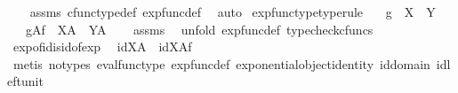 \begin{isabellebody}
%
\isadelimproof
\ \ %
\endisadelimproof
%
\isatagproof
{}\isamarkupfalse%
\ assms\ cfunc{\isacharunderscore}{\kern0pt}type{\isacharunderscore}{\kern0pt}def\ exp{\isacharunderscore}{\kern0pt}func{\isacharunderscore}{\kern0pt}def\ \isamarkupfalse%
\ auto%
\endisatagproof
{\isafoldproof}%
%
\isadelimproof
\isanewline
%
\endisadelimproof
\isanewline
{}\isamarkupfalse%
\ exp{\isacharunderscore}{\kern0pt}func{\isacharunderscore}{\kern0pt}type{\isacharbrackleft}{\kern0pt}type{\isacharunderscore}{\kern0pt}rule{\isacharbrackright}{\kern0pt}{\isacharcolon}{\kern0pt}\isanewline
\ \ \ {\isachardoublequoteopen}g\ {\isacharcolon}{\kern0pt}\ X\ {\isasymrightarrow}\ Y{\isachardoublequoteclose}\isanewline
\ \ \ {\isachardoublequoteopen}g\isactrlbsup A\isactrlesup \isactrlsub f\ {\isacharcolon}{\kern0pt}\ X\isactrlbsup A\isactrlesup \ {\isasymrightarrow}\ Y\isactrlbsup A\isactrlesup {\isachardoublequoteclose}\isanewline
%
\isadelimproof
\ \ %
\endisadelimproof
%
\isatagproof
{}\isamarkupfalse%
\ assms\ \isamarkupfalse%
\ {\isacharparenleft}{\kern0pt}unfold\ exp{\isacharunderscore}{\kern0pt}func{\isacharunderscore}{\kern0pt}def{}{\isacharcomma}{\kern0pt}\ typecheck{\isacharunderscore}{\kern0pt}cfuncs{\isacharparenright}{\kern0pt}%
\endisatagproof
{\isafoldproof}%
%
\isadelimproof
\isanewline
%
\endisadelimproof
\isanewline
{}\isamarkupfalse%
\ exp{\isacharunderscore}{\kern0pt}of{\isacharunderscore}{\kern0pt}id{\isacharunderscore}{\kern0pt}is{\isacharunderscore}{\kern0pt}id{\isacharunderscore}{\kern0pt}of{\isacharunderscore}{\kern0pt}exp{\isacharcolon}{\kern0pt}\isanewline
\ \ {\isachardoublequoteopen}id{\isacharparenleft}{\kern0pt}X\isactrlbsup A\isactrlesup {\isacharparenright}{\kern0pt}\ {\isacharequal}{\kern0pt}\ {\isacharparenleft}{\kern0pt}id{\isacharparenleft}{\kern0pt}X{\isacharparenright}{\kern0pt}{\isacharparenright}{\kern0pt}\isactrlbsup A\isactrlesup \isactrlsub f{\isachardoublequoteclose}\isanewline
%
\isadelimproof
\ \ %
\endisadelimproof
%
\isatagproof
{}\isamarkupfalse%
\ {\isacharparenleft}{\kern0pt}metis\ {\isacharparenleft}{\kern0pt}no{\isacharunderscore}{\kern0pt}types{\isacharparenright}{\kern0pt}\ eval{\isacharunderscore}{\kern0pt}func{\isacharunderscore}{\kern0pt}type\ exp{\isacharunderscore}{\kern0pt}func{\isacharunderscore}{\kern0pt}def\ exponential{\isacharunderscore}{\kern0pt}object{\isacharunderscore}{\kern0pt}identity\ id{\isacharunderscore}{\kern0pt}domain\ id{\isacharunderscore}{\kern0pt}left{\isacharunderscore}{\kern0pt}unit{}{\isacharparenright}{\kern0pt}%

\end{isabellebody}
